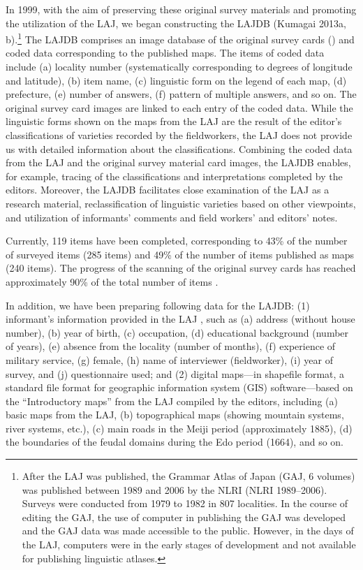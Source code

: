 \documentclass[output=paper]{LSP/langsci}
\begin{document}
In 1999, with the aim of preserving these original survey materials and promoting the utilization of the LAJ, we began constructing the LAJDB (Kumagai 2013a, b).\footnote{ After the LAJ was published, the Grammar Atlas of Japan (GAJ, 6 volumes) was published between 1989 and 2006 by the NLRI (NLRI 1989–2006). Surveys were conducted from 1979 to 1982 in 807 localities. In the course of editing the GAJ, the use of computer in publishing the GAJ was developed and the GAJ data was made accessible to the public. However, in the days of the LAJ, computers were in the early stages of development and not available for publishing linguistic atlases.} The LAJDB comprises an image database of the original survey cards () and coded data corresponding to the published maps. The items of coded data include (a) locality number (systematically corresponding to degrees of longitude and latitude), (b) item name, (c) linguistic form on the legend of each map, (d) prefecture, (e) number of answers, (f) pattern of multiple answers, and so on. The original survey card images are linked to each entry of the coded data. While the linguistic forms shown on the maps from the LAJ are the result of the editor’s classifications of varieties recorded by the fieldworkers, the LAJ does not provide us with detailed information about the classifications. Combining the coded data from the LAJ and the original survey material card images, the LAJDB enables, for example, tracing of the classifications and interpretations completed by the editors. Moreover, the LAJDB facilitates close examination of the LAJ as a research material, reclassification of linguistic varieties based on other viewpoints, and utilization of informants’ comments and field workers’ and editors’ notes.

Currently, 119 items have been completed, corresponding to 43\% of the number of surveyed items (285 items) and 49\% of the number of items published as maps (240 items). The progress of the scanning of the original survey cards has reached approximately 90\% of the total number of items \citep[159]{kumagai_daikibo_2013}.

In addition, we have been preparing following data for the LAJDB: (1) informant’s information provided in the LAJ \citep[47--102]{kokuritsu_kokugo_kenkyujo_nlri_nihon_1966}, such as (a) address (without house number), (b) year of birth, (c) occupation, (d) educational background (number of years), (e) absence from the locality (number of months), (f) experience of military service, (g) female, (h) name of interviewer (fieldworker), (i) year of survey, and (j) questionnaire used; and (2) digital maps—in shapefile format, a standard file format for geographic information system (GIS) software—based on the “Introductory maps” from the LAJ compiled by the editors, including (a) basic maps from the LAJ, (b) topographical maps (showing mountain systems, river systems, etc.), (c) main roads in the Meiji period (approximately 1885), (d) the boundaries of the feudal domains during the Edo period (1664), and so on.
\end{document}
